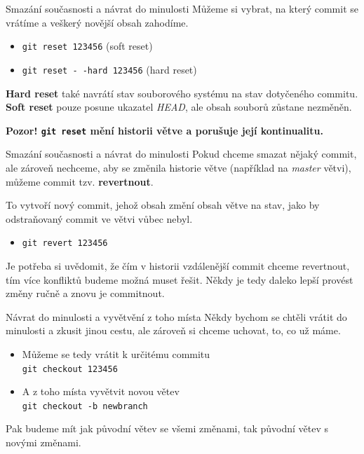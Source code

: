 \documentclass[14pt]{beamer}
\renewcommand{\texttt}[1]{{{\tt\color{blue}#1}}}
\begin{document}
\begin{frame}{Smazání současnosti a návrat do minulosti}
	Můžeme si vybrat, na který commit se vrátíme a veškerý novější obsah zahodíme.
	\begin{itemize}
		\item \texttt{git reset 123456} (soft reset)
		\item \texttt{git reset -\,-hard 123456} (hard reset)
	\end{itemize}
	\textbf{Hard reset} také navrátí stav souborového systému na stav dotyčeného commitu. \textbf{Soft reset} pouze posune ukazatel \textit{HEAD}, ale obsah souborů zůstane nezměněn.
	
	\textbf{Pozor! \texttt{git reset} mění historii větve a porušuje její kontinualitu.}
\end{frame}

\begin{frame}{Smazání současnosti a návrat do minulosti}
	Pokud chceme smazat nějaký commit, ale zároveň nechceme, aby se změnila historie větve (například na \textit{master} větvi), můžeme commit tzv. \textbf{revertnout}.
	
	To vytvoří nový commit, jehož obsah změní obsah větve na stav, jako by odstraňovaný commit ve větvi vůbec nebyl.
	\begin{itemize}
		\item \texttt{git revert 123456} 
	\end{itemize}
	Je potřeba si uvědomit, že čím v historii vzdálenější commit chceme revertnout, tím více konfliktů budeme možná muset řešit. Někdy je tedy daleko lepší provést změny ručně a znovu je commitnout.
\end{frame}

\begin{frame}{Návrat do minulosti a vyvětvění z toho místa}
	Někdy bychom se chtěli vrátit do minulosti a zkusit jinou cestu, ale zároveň si chceme uchovat, to, co už máme. 
	\begin{itemize}
	 \item Můžeme se tedy vrátit k určitému commitu \\ \texttt{git checkout
		 123456} 
	 \item A z toho místa vyvětvit novou větev \\ \texttt{git checkout -b newbranch}
	\end{itemize}
	Pak budeme mít jak původní větev se všemi změnami, tak původní větev s novými změnami.
\end{frame}
\end{document}
